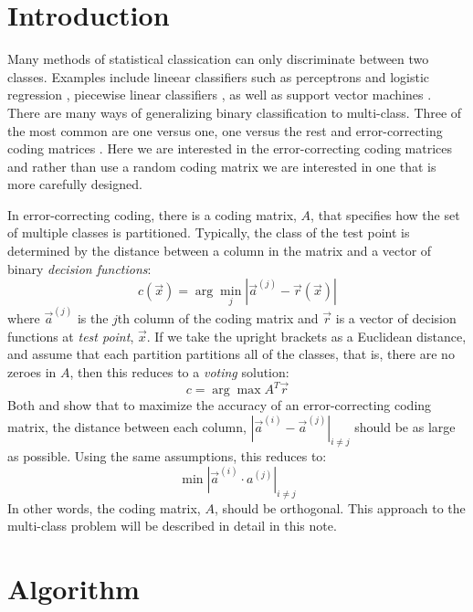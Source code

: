 
\section{Introduction}

Many methods of statistical classication can only discriminate between two classes. 
Examples include lineear classifiers such as perceptrons and logistic regression \citep{Michie_etal1994}, 
piecewise linear classifiers \citep{Herman_Yeung1992},
as well as support vector machines \citep{kernel_intro}.
There are many ways of generalizing binary classification to 
multi-class.
Three of the most common are one versus one, one versus the rest and 
error-correcting coding matrices \citep{Hsu_Lin2002}.
Here we are interested in the error-correcting coding matrices
\citep{Dietterich_Bakiri1995, Windeatt_Ghaderi2002} and
rather than use a random coding matrix we are interested in one that is
more carefully designed.

In error-correcting coding, there is a coding matrix, $A$, that specifies
how the set of multiple classes is partitioned.
Typically, the class of the test point is determined by the distance between
a column in the matrix and a vector of binary {\it decision functions}:
\begin{equation}
	c(\vec x) = \arg \min_j | \vec a^{(j)} - \vec r(\vec x) |
\end{equation}
where $\vec a^{(j)}$ is the $j$th column of the coding matrix and $\vec r$
is a vector of decision functions at {\it test point}, $\vec x$.
If we take the upright brackets as a Euclidean distance, and assume that
each partition partitions all of the classes, that is, there are no zeroes
in $A$, then this reduces to a {\it voting} solution:
\begin{equation}
	c = \arg \max A^T \vec r \label{voting}
\end{equation}
Both \citet{Allwein_etal2000} and \citet{Windeatt_Ghaderi2002} show that to
maximize the accuracy of an error-correcting coding matrix, the distance
between each column, $|\vec a^{(i)} - \vec a^{(j)}|_{i \ne j}$ should be as
large as possible.
Using the same assumptions, this reduces to:
\begin{equation}
	\min |\vec a^{(i)} \cdot a^{(j)}|_{i \ne j}
\end{equation}
In other words, the coding matrix, $A$, should be orthogonal.
This approach to the multi-class problem will be described in detail in this note.

\section{Algorithm}

